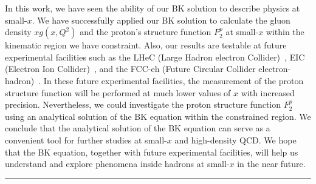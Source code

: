 \documentclass[12pt]{article}
\begin{document}
In this work, we have seen the ability of our BK solution to describe physics at small-$x$. We have successfully applied our BK solution to calculate the gluon density $xg(x,Q^2)$ and the proton's structure function $F_2 ^p$ at small-$x$ within the kinematic region we have constraint. Also, our results are testable at future experimental facilities such as the LHeC (Large Hadron electron Collider)~\cite{an,ao}, EIC (Electron Ion Collider)~\cite{ap}, and the FCC-eh (Future Circular Collider electron-hadron)~\cite{aq}. In these future experimental facilities, the measurement of the proton structure function will be performed at much lower values of $x$ with increased precision. Nevertheless, we could investigate the proton structure function $F_2 ^p$ using an analytical solution of the BK equation within the constrained region. We conclude that the analytical solution of the BK equation can serve as a convenient tool for further studies at small-$x$ and high-density QCD. We hope that the BK equation, together with future experimental facilities, will help us understand and explore phenomena inside hadrons at small-$x$ in the near future.

\begin{center}
\rule{8cm}{0.3mm}
\end{center}
\end{document}
